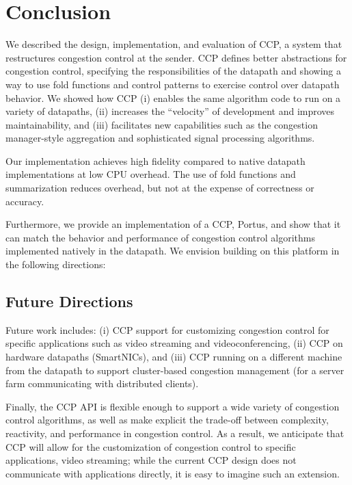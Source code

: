 \chapter{Conclusion}
\label{s:concl}

We described the design, implementation, and evaluation of CCP, a system that restructures congestion control at the sender. CCP defines better abstractions for congestion control, specifying the responsibilities of the datapath and showing a way to use fold functions and control patterns to exercise control over datapath behavior. We showed how CCP (i) enables the same algorithm code to run on a variety of datapaths, (ii) increases the ``velocity'' of development and improves maintainability, and (iii) facilitates new capabilities such as the congestion manager-style aggregation and sophisticated signal processing algorithms. 

Our implementation achieves high fidelity compared to native datapath implementations at low CPU overhead. The use of fold functions and summarization reduces overhead, but not at the expense of correctness or accuracy.

Furthermore, we provide an implementation of a CCP, Portus, and show that it can match the behavior and performance of congestion control algorithms implemented natively in the datapath. We envision building on this platform in the following directions:

\section{Future Directions}
Future work includes: (i) CCP support for customizing congestion control for specific applications such as video streaming and videoconferencing, (ii) CCP on hardware datapaths (\eg SmartNICs), and (iii) CCP running on a different machine from the datapath to support cluster-based congestion management (\eg for a server farm communicating with distributed clients).

Finally, the CCP API is flexible enough to support a wide variety of congestion control algorithms, as well as make explicit the trade-off between complexity, reactivity, and performance in congestion control.
As a result, we anticipate that CCP will allow for the customization of congestion control to specific applications, \eg video streaming; while the current CCP design does not communicate with applications directly, it is easy to imagine such an extension.
